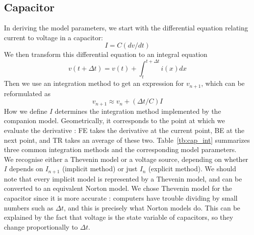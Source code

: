 \documentclass{article}
\begin{document}
\subsection{Capacitor}
In deriving the model parameters, we start with the differential equation relating current to voltage in a capacitor:
\begin{equation}
I=C(dv/dt)
\end{equation}
We then transform this differential equation to an integral equation 
\begin{equation}
v(t+\Delta t) = v(t) + \int_t^{t+\Delta t} i(x) dx
\end{equation}
Then we use an integration method to get an expression for $v_{n+1}$, which can be reformulated as
\begin{equation}
v_{n+1} \approx v_n+(\Delta t/C)I
\end{equation}
How we define $I$ determines the integration method implemented by the companion model. Geometrically, it corresponds to the point at which we evaluate the derivative : FE takes the derivative at the current point, BE at the next point, and TR takes an average of these two. Table~\ref{tb:cap_int} summarizes three common integration methods and the corresponding model parameters.\\
We recognise either a Thevenin model or a voltage source, depending on whether $I$ depends on $I_{n+1}$ (implicit method) or just $I_n$ (explicit method). We should note that every implicit model is represented by a Thevenin model, and can be converted to an equivalent Norton model. We chose Thevenin model for the capacitor since it is more accurate : computers have trouble dividing by small numbers such as $\Delta t$, and this is precisely what Norton models do. This can be explained by the fact that voltage is the state variable of capacitors, so they change proportionally to $\Delta t$.
\end{document}
